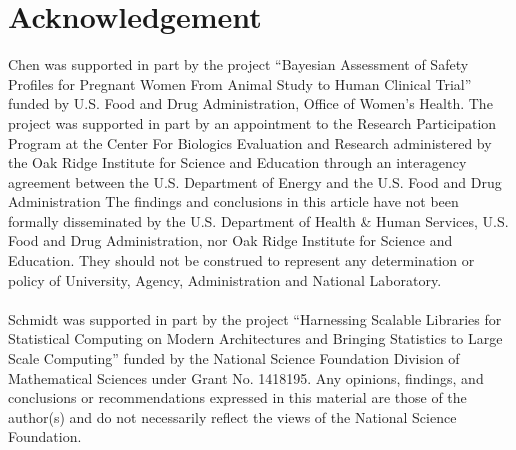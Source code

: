 
\section*{Acknowledgement}

Chen was supported in part by the project
``Bayesian Assessment of Safety Profiles for Pregnant Women From Animal
Study to Human Clinical Trial'' funded by U.S. Food and Drug Administration,
Office of Women's Health. The project was supported
in part by an appointment to the Research Participation Program at the
Center For Biologics Evaluation and Research administered by the Oak Ridge
Institute for Science and Education through an interagency agreement between
the U.S. Department of Energy and the U.S. Food and Drug Administration
%
The findings and conclusions in this article have not been
formally disseminated by the U.S. Department of Health \& Human Services,
U.S. Food and Drug Administration, nor Oak Ridge Institute for Science and
Education. They should not be construed to represent any determination or
policy of University, Agency, Administration and National Laboratory.
\\\\
Schmidt was supported in part by the project ``Harnessing Scalable Libraries 
for Statistical Computing on Modern Architectures and Bringing Statistics to 
Large Scale Computing'' funded by the National Science Foundation Division of 
Mathematical Sciences under Grant No. 1418195.
%
Any  opinions,  findings,  and  conclusions  or  recommendations
expressed  in  this  material  are those  of  the  author(s)  and  do  not
 necessarily  reflect  the  views  of  the  National  Science Foundation.
